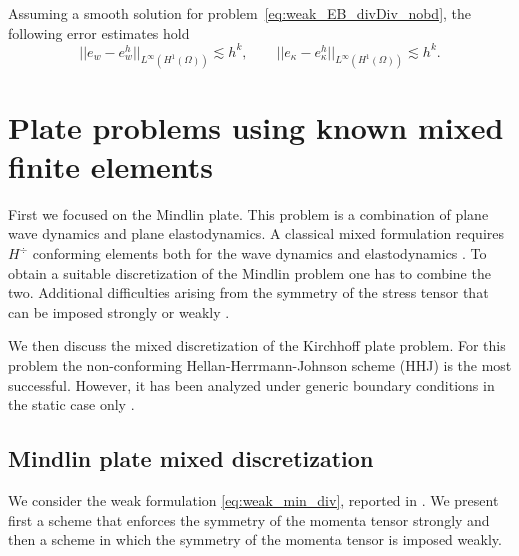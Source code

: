 \begin{conjecture}\label{conj:CGCGestimates}
	Assuming a smooth solution for problem~\eqref{eq:weak_EB_divDiv_nobd}, the following error estimates hold
	\begin{equation}
	\label{eq:errCGCG}
	||e_w - e_w^h||_{L^{\infty} (H^1(\Omega))} \lesssim h^{k}, \qquad
	||e_\kappa - e_\kappa^h||_{L^{\infty} (H^1(\Omega))} \lesssim h^{k}.
	\end{equation}
\end{conjecture}

\section{Plate problems using known mixed finite elements}

First we focused on the Mindlin plate. This problem is a combination of plane wave dynamics and plane elastodynamics. A classical mixed formulation requires $H^{\div}$ conforming elements both for the wave dynamics \cite{becache2000wave} and elastodynamics \cite{becache2001elas,arnold2014elastodynamics}. To obtain a suitable discretization of the Mindlin problem one has to combine the two. Additional difficulties arising from the symmetry of the stress tensor that can be imposed strongly \cite{becache2001elas} or weakly \cite{arnold2014elastodynamics}.

We then discuss the mixed discretization of the Kirchhoff plate problem. For this problem the non-conforming Hellan-Herrmann-Johnson scheme \cite{hellan1967,herrmann1967finite,johnson1973convergence} (HHJ) is the most successful. However, it has been analyzed under generic boundary conditions in the static case only \cite{blum1990}. \\


\subsection{Mindlin plate mixed discretization}
We consider the weak formulation \eqref{eq:weak_min_div}, reported in . We present first a scheme that enforces the symmetry of the momenta tensor strongly and then a scheme in which the symmetry of the momenta tensor is imposed weakly.

